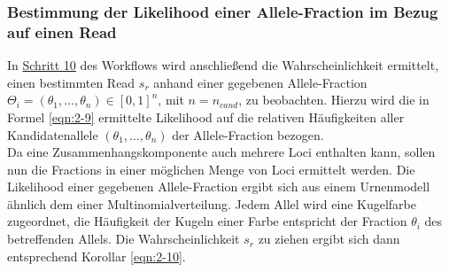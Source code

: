 \subsubsection{Bestimmung der Likelihood einer Allele-Fraction im Bezug auf einen Read} \label{sol_vaf_one_reads}

In \hyperref[step10]{Schritt 10\label{step10txt}} des Workflows wird anschließend die Wahrscheinlichkeit ermittelt, einen bestimmten Read $s_{r}$ anhand einer gegebenen Allele-Fraction $\Theta_{i} = (\theta_{1},\dots,\theta_{n}) \in [0,1]^{n}$, mit $n=n_{cand}$, zu beobachten. Hierzu wird die in Formel \eqref{eqn:2-9} ermittelte Likelihood auf die relativen Häufigkeiten aller Kandidatenallele $ (\theta_{1},\dots,\theta_{n}) $ der Allele-Fraction bezogen.\\

Da eine Zusammenhangskomponente auch mehrere Loci enthalten kann, sollen nun die Fractions in einer möglichen Menge von Loci ermittelt werden. Die Likelihood einer gegebenen Allele-Fraction ergibt sich aus einem Urnenmodell ähnlich dem einer Multinomialverteilung. Jedem Allel wird eine Kugelfarbe zugeordnet, die Häufigkeit der Kugeln einer Farbe entspricht der Fraction $\theta_{i}$ des betreffenden Allels. Die Wahrscheinlichkeit $s_{r}$ zu ziehen ergibt sich dann entsprechend Korollar \eqref{eqn:2-10}.\\

\vspace{-0.5cm}
\begin{center}
\end{center}
